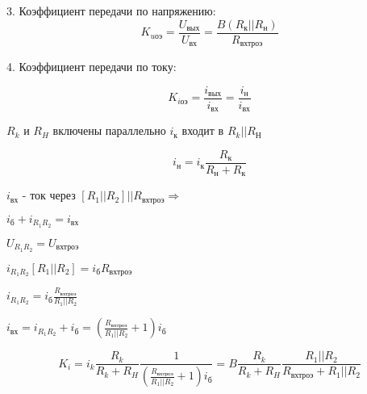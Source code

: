 3. Коэффициент передачи по напряжению:
$$
K_\textit{uоэ}=\frac{U_\textit{вых}}{U_\textit{вх}}=\frac{B(R_\textit{к}||R_\textit{н})}{R_\textit{вхтроэ}}
$$

4. Коэффициент передачи по току:

$$K_\textit{iоэ}=\frac{i_\textit{вых}}{i_\textit{вх}}=\frac{i_\textit{н}}{i_\textit{вх}}$$

$R_k \textit{ и } R_H$ включены параллельно $i_\textit{к}$ входит в $R_\textit{k}||R_\textit{Н}$

$$i_\textit{н}=i_\textit{к}\frac{R_\textit{к}}{R_\textit{н}+R_\textit{к}}$$

$i_\textit{вх}$ - ток через $[R_1||R_2]||R_\textit{вхтроэ}\Rightarrow$

$i_\textit{б}+i_{R_1R_2}=i_\textit{вх}$

$U_{R_1R_2}=U_\textit{вхтроэ}$

$i_{R_1R_2}[R_1||R_2]=i_\textit{б}R_\textit{вхтроэ}$

$i_{R_1R_2}=i_\textit{б}\frac{R_\textit{вхтроэ}}{R_1||R_2}$

$i_\textit{вх}=i_{R_1R_2}+i_\textit{б}=\left(\frac{R_\textit{вхтроэ}}{R_1||R_2}+1\right)i_\textit{б}$

$$K_i=i_k\frac{R_k}{R_k+R_H}\frac{1}{\left(\frac{R_\textit{вхтроэ}}{R_1||R_2}+1\right)i_\textit{б}}=B\frac{R_k}{R_k+R_H}\frac{R_1||R_2}{R_\textit{вхтроэ}+R_1||R_2}
$$

\pagebreak

